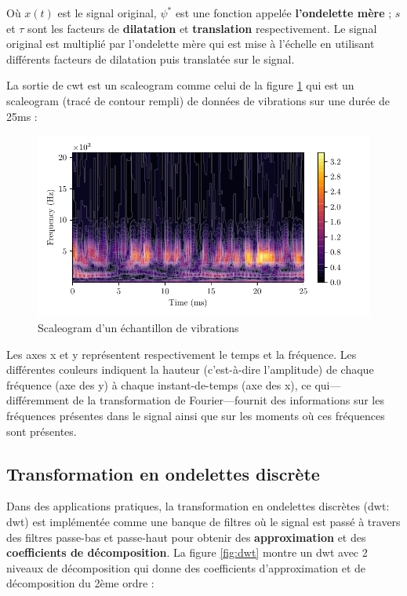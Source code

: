 Où $x(t)$ est le signal original, $\psi^*$ est une fonction appelée \textbf{l'ondelette mère} ; $s$ et $\tau$ sont les facteurs de \textbf{dilatation} et \textbf{translation} respectivement. Le signal original est multiplié par l'ondelette mère qui est mise à l'échelle en utilisant différents facteurs de dilatation puis translatée sur le signal.

La sortie de \acrshort{cwt} est un scaleogram comme celui de la figure \ref{fig:scaleogram} qui est un scaleogram (tracé de contour rempli) de données de vibrations sur une durée de 25ms :

\begin{figure}[H]
    \centering
    \includegraphics{figures/scaleogram.pdf}
    \caption{Scaleogram d'un échantillon de vibrations}
    \label{fig:scaleogram}
\end{figure}

Les axes x et y représentent respectivement le temps et la fréquence. Les différentes couleurs indiquent la hauteur (c'est-à-dire l'amplitude) de chaque fréquence (axe des y) à chaque instant-de-temps (axe des x), ce qui—différemment de la transformation de Fourier—fournit des informations sur les fréquences présentes dans le signal ainsi que sur les moments où ces fréquences sont présentes.

\subsection{Transformation en ondelettes discrète}

Dans des applications pratiques, la transformation en ondelettes discrètes (\acrlong{dwt}: \acrshort{dwt}) est implémentée comme une banque de filtres où le signal est passé à travers des filtres passe-bas et passe-haut pour obtenir des \textbf{approximation} et des \textbf{coefficients de décomposition}. La figure \ref{fig:dwt} montre un \acrshort{dwt} avec 2 niveaux de décomposition qui donne des coefficients d'approximation et de décomposition du 2ème ordre :

